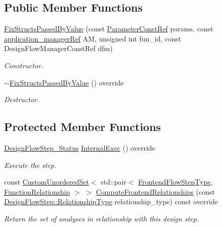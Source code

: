 \subsection*{Public Member Functions}
\begin{DoxyCompactItemize}
\item 
\hyperlink{classFixStructsPassedByValue_af23bf72c70aa5551ee14d7d77716a631}{Fix\+Structs\+Passed\+By\+Value} (const \hyperlink{Parameter_8hpp_a37841774a6fcb479b597fdf8955eb4ea}{Parameter\+Const\+Ref} params, const \hyperlink{application__manager_8hpp_a04ccad4e5ee401e8934306672082c180}{application\+\_\+manager\+Ref} AM, unsigned int fun\+\_\+id, const Design\+Flow\+Manager\+Const\+Ref dfm)
\begin{DoxyCompactList}\small\item\em Constructor. \end{DoxyCompactList}\item 
\hyperlink{classFixStructsPassedByValue_a3c2599e7977b35f4617dcc259468294c}{$\sim$\+Fix\+Structs\+Passed\+By\+Value} () override
\begin{DoxyCompactList}\small\item\em Destructor. \end{DoxyCompactList}\end{DoxyCompactItemize}
\subsection*{Protected Member Functions}
\begin{DoxyCompactItemize}
\item 
\hyperlink{design__flow__step_8hpp_afb1f0d73069c26076b8d31dbc8ebecdf}{Design\+Flow\+Step\+\_\+\+Status} \hyperlink{classFixStructsPassedByValue_a30d76d47407cac74933b87bca8bb4292}{Internal\+Exec} () override
\begin{DoxyCompactList}\small\item\em Execute the step. \end{DoxyCompactList}\item 
const \hyperlink{classCustomUnorderedSet}{Custom\+Unordered\+Set}$<$ std\+::pair$<$ \hyperlink{frontend__flow__step_8hpp_afeb3716c693d2b2e4ed3e6d04c3b63bb}{Frontend\+Flow\+Step\+Type}, \hyperlink{classFrontendFlowStep_af7cf30f2023e5b99e637dc2058289ab0}{Function\+Relationship} $>$ $>$ \hyperlink{classFixStructsPassedByValue_a2c6b768192ecbd06442580abd9b162bc}{Compute\+Frontend\+Relationships} (const \hyperlink{classDesignFlowStep_a723a3baf19ff2ceb77bc13e099d0b1b7}{Design\+Flow\+Step\+::\+Relationship\+Type} relationship\+\_\+type) const override
\begin{DoxyCompactList}\small\item\em Return the set of analyses in relationship with this design step. \end{DoxyCompactList}\end{DoxyCompactItemize}
